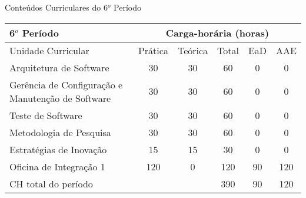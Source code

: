 \begin{quadro}[ht!]
\centering
\caption{Conteúdos Curriculares do 6$^o$ Período}\label{qua:periodo6}
\begin{tabular}{|p{5.0cm}|c|c|c|c|c|}
\hline
\rowcolor{blue1} 6$^o$ Período & \multicolumn{5}{|c|}{\centering Carga-horária (horas)} \\ \hline
\rowcolor{blue1} Unidade Curricular & Prática & Teórica & Total & EaD & AAE \\ \hline
Arquitetura de Software & 30 & 30 & 60 & 0	&	0 \\	\hline
Gerência de Configuração e Manutenção de Software & 30 & 30 & 60 & 0	&	0 \\	\hline
Teste de Software  & 30 & 30 & 60 & 0	&	0 \\	\hline
Metodologia de Pesquisa & 30 & 30 & 60 & 0	&	0 \\	\hline
Estratégias de Inovação & 15 & 15 & 30 & 0	&	0 \\	\hline
Oficina de Integração 1 & 120 & 0 & 120 & 90	&	120 \\	\hline
CH total do período & \multicolumn{2}{p{3.3cm}|}{\cellcolor{blue1}} & 390 & 90	&	120 \\ \hline
\end{tabular} \end{quadro}